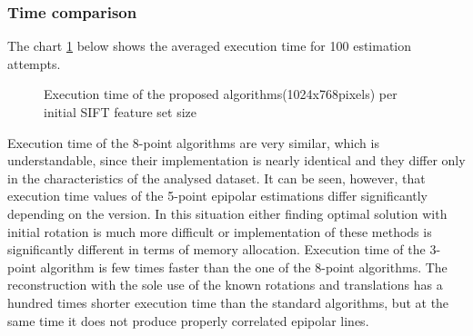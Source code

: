 \subsubsection{Time comparison}
The chart \ref{plot:ExecutionTime} below shows the averaged  execution time for 100 estimation attempts.
\begin{figure}[hb!]
  \begin{center}
    \caption[Execution time of the proposed algorithms depending on initial SIFT feature set size]{Execution time of the proposed algorithms(1024x768pixels) per initial SIFT feature set size}
    \label{plot:ExecutionTime}
  \end{center}
\end{figure}
Execution time of the 8-point algorithms are very similar, which is understandable, since their implementation is nearly identical and they differ only in the characteristics of the analysed dataset. It can be seen, however, that execution time values of the 5-point epipolar estimations differ significantly depending on the version. In this situation either finding optimal solution with initial rotation is much more difficult or implementation of these methods is significantly different in terms of memory allocation. Execution time of the 3-point algorithm is few times faster than the one of the 8-point algorithms. The reconstruction with the sole use of the known rotations and translations has a hundred times shorter execution time than the standard algorithms, but at the same time it does not produce properly correlated epipolar lines.

